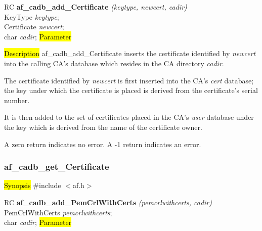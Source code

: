 RC {\bf af\_cadb\_add\_Certificate} {\em (keytype, newcert, cadir)} \\
KeyType     {\em keytype}; \\
Certificate {\em *newcert}; \\
char	    {\em *cadir};
\hl{Parameter}



\hl{Description}
af\_cadb\_add\_Certificate inserts the certificate identified by {\em newcert} into the 
calling CA's database which resides in the CA directory {\em cadir}. 

The certificate identified by {\em newcert} is first inserted into the CA's {\em cert} database;
the key under which the certificate is placed is derived from the certificate's serial number.

It is then added to the set of certificates placed in the CA's {\em user} database under the key
which is derived from the name of the certificate owner.

A zero return indicates no error.
A -1 return indicates an error.



\subsubsection{af\_cadb\_get\_Certificate}
\label{af_cadb_add_PemCrlWithCerts}
\hl{Synopsis}
\#include $<$af.h$>$

RC {\bf af\_cadb\_add\_PemCrlWithCerts} {\em (pemcrlwithcerts, cadir)} \\
PemCrlWithCerts	{\em *pemcrlwithcerts}; \\
char		{\em *cadir};
\hl{Parameter}


